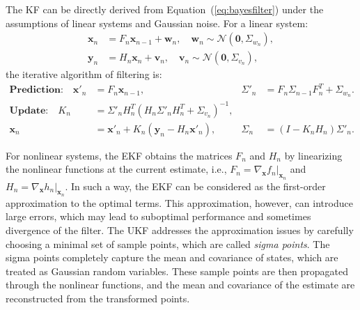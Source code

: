 The \ac{KF} \citep{kf1960} can be directly derived from Equation~(\ref{eq:bayesfilter}) under the assumptions of linear systems and Gaussian noise. For a linear system:
\begin{subequations}
    \begin{align}
        \boldsymbol{x}_n &= F_n\boldsymbol{x}_{n-1} + \boldsymbol{w}_n, \quad \boldsymbol{w}_n\sim\mathcal{N}(\boldsymbol{0}, \Sigma_{w_n}),\\
        \boldsymbol{y}_n &= H_n\boldsymbol{x}_n + \boldsymbol{v}_n, \quad \boldsymbol{v}_n\sim\mathcal{N}(\boldsymbol{0}, \Sigma_{v_n}),
    \end{align}
\end{subequations}
the iterative algorithm of filtering is:
\begin{subequations}
\begin{align}
    \label{eq:kalman_prediction}\textbf{Prediction:}\quad \boldsymbol{x}'_n &= F_n\boldsymbol{x}_{n-1}, & \Sigma'_{n} &= F_n\Sigma_{n-1}F_n^T+\Sigma_{w_n}. \\
    \label{eq:kalman_update}\textbf{Update:}\quad K_n &= \Sigma'_{n}H_n^T(H_n\Sigma'_{n}H_n^T+\Sigma_{v_n})^{-1},  \\
    \boldsymbol{x}_n &= \boldsymbol{x}'_n+K_n(\boldsymbol{y}_n-H_n\boldsymbol{x}'_n),  & \Sigma_n &= (I-K_nH_n)\Sigma'_{n}. 
\end{align}
\end{subequations}

For nonlinear systems, the \acf{EKF} \citep{simon2006optimal} obtains the matrices $F_n$ and $H_n$ by linearizing the nonlinear functions at the current estimate, i.e., $F_n=\nabla_{\boldsymbol{x}} f_n|_{\boldsymbol{x}_n}$ and $H_n=\nabla_{\boldsymbol{x}} h_n|_{\boldsymbol{x}_n}$. In such a way, the \ac{EKF} can be considered as the first-order approximation to the optimal terms. This approximation, however, can introduce large errors, which may lead to suboptimal performance and sometimes divergence of the filter. The \acf{UKF} \citep{ukf2000} addresses the approximation issues by carefully choosing a minimal set of sample points, which are called \textit{sigma points}. The sigma points completely capture the mean and covariance of states, which are treated as Gaussian random variables. These sample points are then propagated through the nonlinear functions, and the mean and covariance of the estimate are reconstructed from the transformed points. 

